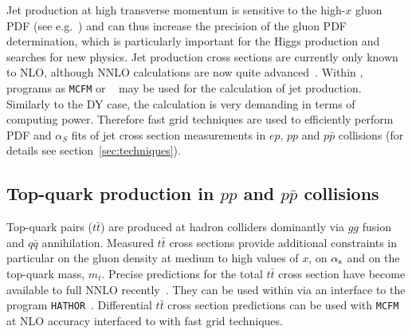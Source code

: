 Jet production at high transverse momentum is sensitive to the high-$x$ gluon 
PDF (see e.g.~\cite{MSTWpdf}) and can thus increase the precision of the 
gluon PDF determination, which is particularly important for the Higgs production and searches for new physics.
Jet production cross sections are currently only known to NLO, although NNLO 
calculations are now quite advanced~\cite{nigel:2013,nigel:2010,Currie:2013dwa}. 
Within \fitter, programs as \texttt{MCFM} or
\nlojetpp~\cite{Nagy:1998bb,Nagy:2001fj} may be used for the 
calculation of jet production.
Similarly to the DY case, the calculation 
is very demanding in terms of computing power. 
Therefore fast grid techniques are used to efficiently perform PDF and
$\alpha_S$ fits of jet cross section measurements in $ep$, $pp$ and
$p\bar{p}$ collisions
(for details see section~\ref{sec:techniques}).





\subsection{Top-quark production in $pp$ and $p \bar p$ collisions}

Top-quark pairs ($t \bar t$) are produced at hadron colliders dominantly via $gg$ fusion 
and $q \bar q$ annihilation. Measured $t \bar t$ cross sections provide additional 
constraints in particular on the gluon density at medium to high values of $x$, 
on $\alpha_\mathrm{s}$ and on the top-quark mass, $m_t$. 
Precise predictions for the total $t \bar t$ cross section have become available 
to full NNLO recently~\cite{Czakon:2013goa}. They can be used within \fitter via an interface 
to the program \texttt{HATHOR}~\cite{Aliev:2010zk}. Differential $t \bar t$ cross section
predictions can be used with \texttt{MCFM}~\cite{Campbell:2010ff,Campbell:2009ss,Campbell:2005bb,Campbell:2004ch,Campbell:2012uf} at NLO accuracy interfaced to \fitter with fast grid techniques.

